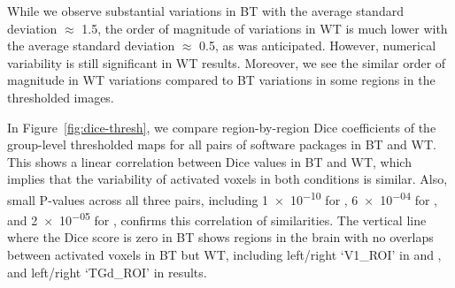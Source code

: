 \documentclass[conference]{IEEEtran}
\begin{document}
While we observe substantial variations in BT with the average standard deviation $\approx$ 1.5,
the order of magnitude of variations in WT is much lower with the average standard deviation $\approx$ 0.5,
as was anticipated. However, numerical variability is still significant in WT results.
Moreover, we see the similar order of magnitude in WT variations compared to BT variations
in some regions in the thresholded images.

In Figure~\ref{fig:dice-thresh}, we compare region-by-region Dice coefficients of
the group-level thresholded maps for all pairs of software packages in BT and WT.
This shows a linear correlation between Dice values in BT and WT,
which implies that the variability of activated voxels in both conditions is similar.
Also, small P-values across all three pairs, including \num{1e-10} for \fslafni, \num{6e-04} for \fslspm,
and \num{2e-05} for \afnispm, confirms this correlation of similarities.
The vertical line where the Dice score is zero in BT shows regions in the brain with no overlaps between activated voxels in BT but WT,
including left/right `V1\_ROI' in \fslafni and \fslspm, and left/right `TGd\_ROI' in \afnispm results.
\end{document}
